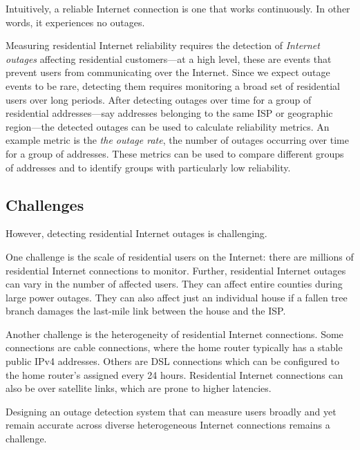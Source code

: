 Intuitively, a reliable Internet connection is one that works
continuously. In other words, it experiences no outages. 

Measuring residential Internet reliability requires the detection of
\emph{Internet outages} affecting residential customers---at a high
level, these are events that prevent users from communicating over the
Internet. Since we expect outage events to be rare, detecting them
requires monitoring a broad set of residential users over long
periods. After detecting outages over time for a group of residential
addresses---say addresses belonging to the same ISP or geographic
region---the detected outages can be used to calculate reliability
metrics. An example metric is the \emph{the outage rate}, the number of
outages occurring over time for a group of addresses. These metrics
can be used to compare different groups of addresses and to identify
groups with particularly low reliability.

\subsection{Challenges}



 However, detecting residential Internet outages is challenging. 

One challenge is the scale of residential users on the Internet: there
are millions of residential Internet connections to monitor. Further,
residential Internet outages can vary in the number of
affected users. They can affect entire counties during large power
outages. They can also affect just an individual house if a fallen
tree branch damages the last-mile link between the house and the
ISP. 

Another challenge is the heterogeneity of residential Internet
connections. Some connections are cable connections, where the home router
typically has a stable public IPv4 addresses. Others are DSL
connections which can be configured to the home router's assigned
every 24 hours. Residential Internet connections can also be over
satellite links, which are prone to higher latencies. 

Designing an outage detection system that can measure users
broadly and yet remain accurate across diverse heterogeneous
Internet connections remains a challenge.

